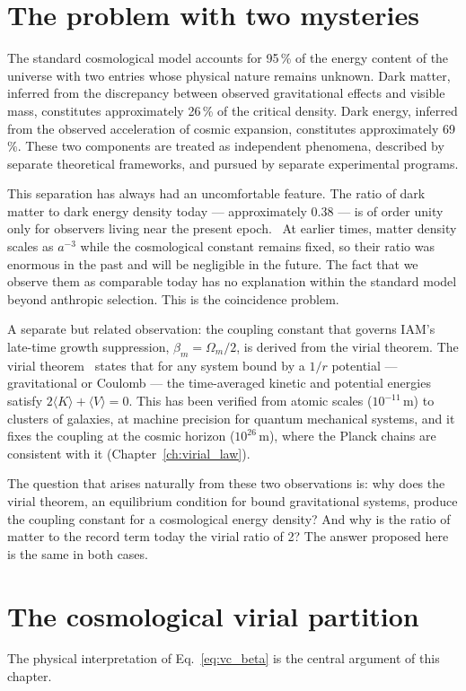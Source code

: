 \section{The problem with two mysteries}\label{sec:vp_problem}
The standard cosmological model accounts for 95\,\% of the energy content of the universe with two entries whose physical nature remains unknown. Dark
matter, inferred from the discrepancy between observed gravitational effects and visible mass, constitutes approximately 26\,\% of the critical density.
Dark energy, inferred from the observed acceleration of cosmic expansion, constitutes approximately 69\,\%. These two components are treated as independent
phenomena, described by separate theoretical frameworks, and pursued by separate experimental programs. \observed

This separation has always had an uncomfortable feature. The ratio of dark matter to dark energy density today --- approximately 0.38 --- is of order
unity only for observers living near the present epoch. \calc\ At earlier times, matter density scales as $a^{-3}$ while the cosmological constant
remains fixed, so their ratio was enormous in the past and will be negligible in the future. The fact that we observe them as comparable today has no
explanation within the standard model beyond anthropic selection. This is the coincidence problem.

A separate but related observation: the coupling constant that governs IAM's late-time growth suppression, $\beta_m=\Omega_m/2$, is derived from the virial
theorem. The virial theorem~\cite{Clausius1870} states that for any system bound by a $1/r$ potential --- gravitational or Coulomb --- the time-averaged kinetic and potential
energies satisfy $2\langle K\rangle+\langle V\rangle=0$. This has been verified from atomic scales ($10^{-11}$\,m) to clusters of galaxies, at machine
precision for quantum mechanical systems, and it fixes the coupling at the cosmic horizon ($10^{26}$\,m), where the Planck chains are consistent with it
(Chapter~\ref{ch:virial_law}). \observed{} \measured

The question that arises naturally from these two observations is: why does the virial theorem, an equilibrium condition for bound gravitational systems,
produce the coupling constant for a cosmological energy density? And why is the ratio of matter to the record term today the virial ratio of 2? The
answer proposed here is the same in both cases.

\section{The cosmological virial partition}\label{sec:vp_partition}
The physical interpretation of Eq.~\eqref{eq:vc_beta} is the central argument of this chapter. \conjecture

